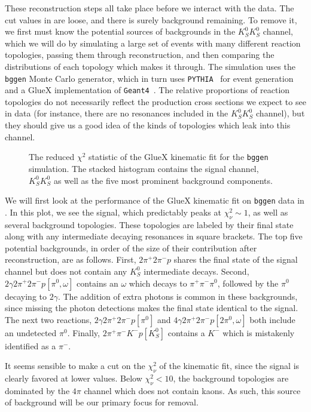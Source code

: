 These reconstruction steps all take place before we interact with the data. The cut values in  are loose, and there is surely background remaining. To remove it, we first must know the potential sources of backgrounds in the $K_S^0K_S^0$ channel, which we will do by simulating a large set of events with many different reaction topologies, passing them through reconstruction, and then comparing the distributions of each topology which makes it through. The simulation uses the \texttt{bggen} Monte Carlo generator, which in turn uses \texttt{PYTHIA}~\cite{Bierlich2022} for event generation and a GlueX implementation of \texttt{Geant4}~\cite{Allison2006,Allison2016,Agostinelli2003}. The relative proportions of reaction topologies do not necessarily reflect the production cross sections we expect to see in data (for instance, there are no resonances included in the $K_S^0K_S^0$ channel), but they should give us a good idea of the kinds of topologies which leak into this channel.

\begin{figure}
  \begin{center}
    
  \end{center}
  \caption{The reduced $\chi^2$ statistic of the GlueX kinematic fit for the \texttt{bggen} simulation. The stacked histogram contains the signal channel, $K_S^0K_S^0$ as well as the five most prominent background components.}\label{fig:bggen-chisqdof}
\end{figure}

We will first look at the performance of the GlueX kinematic fit on \texttt{bggen} data in . In this plot, we see the signal, which predictably peaks at $\chi^2_\nu \sim 1$, as well as several background topologies. These topologies are labeled by their final state along with any intermediate decaying resonances in square brackets. The top five potential backgrounds, in order of the size of their contribution after reconstruction, are as follows. First, $2\pi^+2\pi^- p$ shares the final state of the signal channel but does not contain any $K_S^0$ intermediate decays. Second, $2\gamma 2\pi^+ 2\pi^- p [\pi^0, \omega]$ contains an $\omega$ which decays to $\pi^+\pi^-\pi^0$, followed by the $\pi^0$ decaying to $2\gamma$. The addition of extra photons is common in these backgrounds, since missing the photon detections makes the final state identical to the signal. The next two reactions, $2\gamma 2\pi^+ 2\pi^- p [\pi^0]$ and $4\gamma 2\pi^+ 2\pi^- p [2\pi^0, \omega]$ both include an undetected $\pi^0$. Finally, $2\pi^+\pi^- K^- p[K_S^0]$ contains a $K^-$ which is mistakenly identified as a $\pi^-$.

It seems sensible to make a cut on the $\chi^2_\nu$ of the kinematic fit, since the signal is clearly favored at lower values. Below $\chi^2_\nu < 10$, the background topologies are dominated by the $4\pi$ channel which does not contain kaons. As such, this source of background will be our primary focus for removal.
